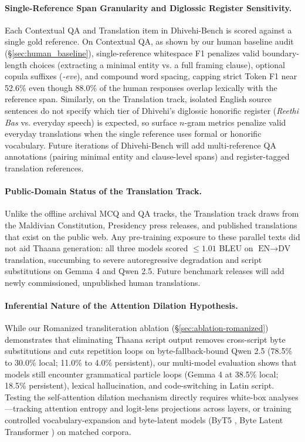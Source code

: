 \documentclass[acmsmall,review,anonymous]{acmart}
\begin{document}
\paragraph{Single-Reference Span Granularity and Diglossic Register Sensitivity.}
Each Contextual QA and Translation item in Dhivehi-Bench is scored against a single gold reference. On Contextual QA, as shown by our human baseline audit (\S\ref{sec:human_baseline}), single-reference whitespace F1 penalizes valid boundary-length choices (extracting a minimal entity vs. a full framing clause), optional copula suffixes (\textit{-eve}), and compound word spacing, capping strict Token F1 near 52.6\% even though 88.0\% of the human responses overlap lexically with the reference span. Similarly, on the Translation track, isolated English source sentences do not specify which tier of Dhivehi's diglossic honorific register (\textit{Reethi Bas} vs. everyday speech) is expected, so surface $n$-gram metrics penalize valid everyday translations when the single reference uses formal or honorific vocabulary. Future iterations of Dhivehi-Bench will add multi-reference QA annotations (pairing minimal entity and clause-level spans) and register-tagged translation references.

\paragraph{Public-Domain Status of the Translation Track.}
Unlike the offline archival MCQ and QA tracks, the Translation track draws from the Maldivian Constitution, Presidency press releases, and published translations that exist on the public web. Any pre-training exposure to these parallel texts did not aid Thaana generation: all three models scored $\leq 1.01$ BLEU on $\text{EN}\rightarrow\text{DV}$ translation, succumbing to severe autoregressive degradation and script substitutions on Gemma 4 and Qwen 2.5. Future benchmark releases will add newly commissioned, unpublished human translations.

\paragraph{Inferential Nature of the Attention Dilation Hypothesis.}
While our Romanized transliteration ablation (\S\ref{sec:ablation-romanized}) demonstrates that eliminating Thaana script output removes cross-script byte substitutions and cuts repetition loops on byte-fallback-bound Qwen 2.5 (78.5\% to 30.0\% local; 11.0\% to 4.0\% persistent), our multi-model evaluation shows that models still encounter grammatical particle loops (Gemma 4 at 38.5\% local; 18.5\% persistent), lexical hallucination, and code-switching in Latin script. Testing the self-attention dilation mechanism directly requires white-box analyses---tracking attention entropy and logit-lens projections across layers, or training controlled vocabulary-expansion and byte-latent models (ByT5 \cite{xue_byt5_2022}, Byte Latent Transformer \cite{pagnoni_byte_2025}) on matched corpora.
\end{document}
